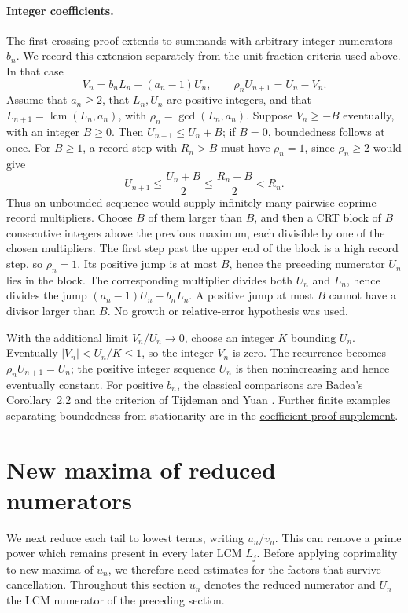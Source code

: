 \documentclass[11pt]{article}
\begin{document}
\paragraph{Integer coefficients.}
The first-crossing proof extends to summands with arbitrary integer
numerators $b_n$. We record this extension separately from the
unit-fraction criteria used above. In that case
\[
 V_n=b_nL_n-(a_n-1)U_n,\qquad
 \rho_nU_{n+1}=U_n-V_n.
\]
Assume that $a_n\ge2$, that $L_n,U_n$ are positive integers, and that
$L_{n+1}=\operatorname{lcm}(L_n,a_n)$, with
$\rho_n=\gcd(L_n,a_n)$. Suppose $V_n\ge-B$ eventually, with an integer
$B\ge0$. Then $U_{n+1}\le U_n+B$; if $B=0$, boundedness follows at once.
For $B\ge1$, a record step with $R_n>B$ must have $\rho_n=1$, since
$\rho_n\ge2$ would give
\[
 U_{n+1}\le\frac{U_n+B}{2}\le\frac{R_n+B}{2}<R_n.
\]
Thus an unbounded sequence would supply infinitely many pairwise coprime
record multipliers. Choose $B$ of them larger than $B$, and then a CRT
block of $B$ consecutive integers above the previous maximum, each
divisible by one of the chosen multipliers. The first step past the upper
end of the block is a high record step, so $\rho_n=1$.
Its positive jump is at most $B$, hence the preceding numerator $U_n$
lies in the block. The corresponding multiplier divides both $U_n$ and
$L_n$, hence divides the jump $(a_n-1)U_n-b_nL_n$. A positive jump at most $B$ cannot have a divisor
larger than $B$. No growth or relative-error hypothesis was used.

With the additional limit $V_n/U_n\to0$, choose an integer $K$ bounding
$U_n$. Eventually $|V_n|<U_n/K\le1$, so the integer $V_n$ is zero.
The recurrence becomes $\rho_nU_{n+1}=U_n$; the positive integer
sequence $U_n$ is then nonincreasing and hence eventually constant. For positive $b_n$, the classical comparisons
are Badea's Corollary~2.2 \cite[p.~316]{badea1993} and the criterion of
Tijdeman and Yuan \cite{tijdemanyuan2002}. Further finite examples
separating boundedness from stationarity are in the
\href{https://github.com/wcook04/plectis-erdos/blob/eccd8afc6db3c02a2265d0601b727d6c5e4467d5/lean/ErdosProblems/Erdos243/CoefficientUniformBoundedHeight.md}
{coefficient proof supplement}.

\section{New maxima of reduced numerators}\label{long243:sec:records}

We next reduce each tail to lowest terms, writing $u_n/v_n$.
This can remove a prime power which remains present in every later
LCM $L_j$. Before applying coprimality to new maxima of $u_n$, we
therefore need estimates for the factors that survive cancellation.
Throughout this section $u_n$ denotes the reduced numerator and
$U_n$ the LCM numerator of the preceding section.
\end{document}
